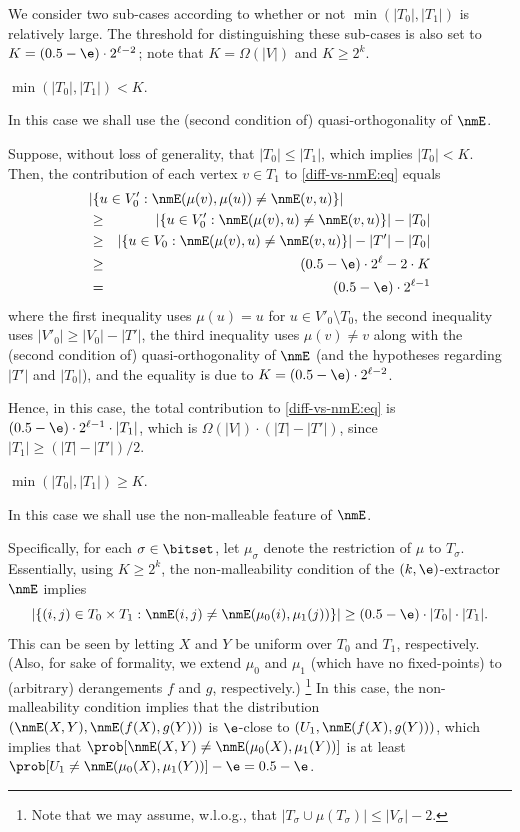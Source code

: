 We consider two sub-cases according to
whether or not $\min(|T_0|,|T_1|)$ is relatively large.
The threshold for distinguishing these sub-cases
is also set to $K=(0.5-\e)\cdot2^{\ell-2}$;
note that $K=\Omega(|V|)$ and $K\geq2^k$.


\BDes
%
\item[{\em Case 2.1}:] $\min(|T_0|,|T_1|)<K$.

In this case we shall use
the (second condition of) quasi-orthogonality of $\nmE$.

Suppose, without loss of generality, that $|T_0|\leq|T_1|$,
which implies $|T_0|<K$.
%
Then, the contribution of
each vertex $v\in T_1$ to \eqref{diff-vs-nmE:eq} equals
\begin{eqnarray*}
\lefteqn{|\{u\in V'_0:\nmE(\mu(v),\mu(u))\neq\nmE(v,u)\}|} \\
&\geq& |\{u\in V'_0:\nmE(\mu(v),u)\neq\nmE(v,u)\}| - |T_0| \\
&\geq& |\{u\in V_0:\nmE(\mu(v),u)\neq\nmE(v,u)\}|-|T'|-|T_0| \\
%
&\geq& (0.5-\e)\cdot2^\ell-2\cdot K \\
&=& (0.5-\e)\cdot2^{\ell-1}
\end{eqnarray*}
where the first inequality uses $\mu(u)=u$ for $u\in V'_0\setminus T_0$,
the second inequality uses $|V'_0|\geq|V_0|-|T'|$,
the third inequality uses $\mu(v)\neq v$
along with the (second condition of) quasi-orthogonality of $\nmE$
(and the hypotheses regarding $|T'|$ and $|T_0|$),
and the equality is due to $K=(0.5-\e)\cdot2^{\ell-2}$.


Hence, in this case,
the total contribution to \eqref{diff-vs-nmE:eq} is
$(0.5-\e)\cdot2^{\ell-1}\cdot|T_1|$,
which is $\Omega(|V|)\cdot(|T|-|T'|)$,
since $|T_1|\geq(|T|-|T'|)/2$.
%

%
\item[{\em Case 2.2}:] $\min(|T_0|,|T_1|)\geq K$.

In this case we shall use the non-malleable feature of $\nmE$.

Specifically, for each $\sigma\in\bitset$,
let $\mu_\sigma$ denote the restriction of $\mu$ to $T_\sigma$.
%
%
Essentially, using $K\geq2^k$,
the non-malleability condition of the $(k,\e)$-extractor $\nmE$ implies
%
$$\left|\left\{(i,j)\in T_0\times T_1:
            \nmE(i,j)\neq\nmE(\mu_0(i),\mu_1(j))\right\}\right|
  \geq(0.5-\e)\cdot|T_0|\cdot|T_1|.$$
This can be seen by
letting $X$ and $Y$ be uniform over $T_0$ and $T_1$, respectively.
(Also, for sake of formality, we extend $\mu_0$ and $\mu_1$
(which have no fixed-points)
to (arbitrary) derangements $f$ and $g$, respectively.)
\footnote{Note that we may assume, w.l.o.g.,
that $|T_\sigma\cup\mu(T_\sigma)|\leq|V_\sigma|-2$.}
%
In this case, the non-malleability condition implies that
the distribution $(\nmE(X,Y),\nmE(f(X),g(Y)))$
is $\e$-close to $(U_1,\nmE(f(X),g(Y)))$,
which implies that $\prob[\nmE(X,Y)\neq\nmE(\mu_0(X),\mu_1(Y))]$
is at least $\prob[U_1\neq\nmE(\mu_0(X),\mu_1(Y))]-\e=0.5-\e$.
%
%
%
%
%
%
%
%
%
%
%
%
%
%
%
%
%
%
%
%
%
%

